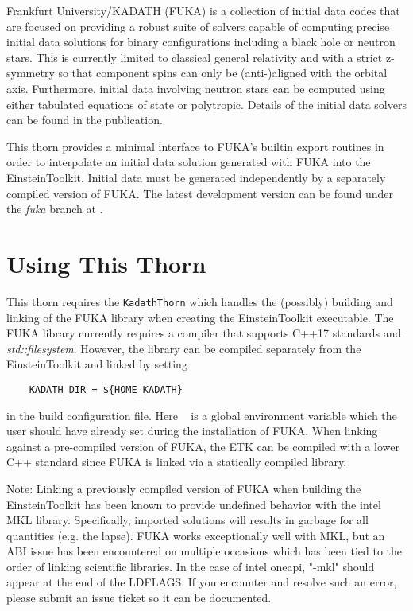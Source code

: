 Frankfurt University/KADATH (FUKA) is a collection of initial data codes 
that are focused on providing a robust suite of solvers capable of computing precise
initial data solutions for binary configurations including a black hole or neutron stars.  
This is currently limited to classical general relativity and with a strict z-symmetry so that
component spins can only be (anti-)aligned with the orbital axis. Furthermore, initial data involving
neutron stars can be computed using either tabulated equations of state or polytropic.  Details
of the initial data solvers can be found in the publication\cite{Papenfort2021a}.

This thorn provides a minimal interface to FUKA's builtin export routines in order to
interpolate an initial data solution generated with FUKA
into the EinsteinToolkit.  Initial data must be generated independently by a separately compiled
version of FUKA.  The latest development version can be found under the \textit{fuka} branch at \cite{fukacodes}.


\section{Using This Thorn}
This thorn requires the \texttt{KadathThorn} which handles the (possibly) building and linking of the FUKA library when creating
the EinsteinToolkit executable.  The FUKA library currently requires a compiler that supports C++17 standards and \textit{std::filesystem}.
However, the library can be compiled separately from the EinsteinToolkit and linked by setting 
\begin{verbatim}
    KADATH_DIR = ${HOME_KADATH}    
\end{verbatim}
in the build configuration file.  Here \hk~ is a global environment variable which the user should have already set during
the installation of FUKA.  When linking against a pre-compiled version of FUKA, the ETK can be compiled with a lower C++ standard since FUKA
is linked via a statically compiled library.

Note: Linking a previously compiled version of FUKA when building the EinsteinToolkit has been known to provide undefined behavior with
the intel MKL library.  Specifically, imported solutions will results in garbage for all quantities (e.g. the lapse).
FUKA works exceptionally well with MKL, but an ABI issue has been encountered on multiple occasions which has been
tied to the order of linking scientific libraries.  In the case of intel oneapi, "-mkl" should appear at the end of the LDFLAGS. If you
encounter and resolve such an error, please submit an issue ticket so it can be documented.

